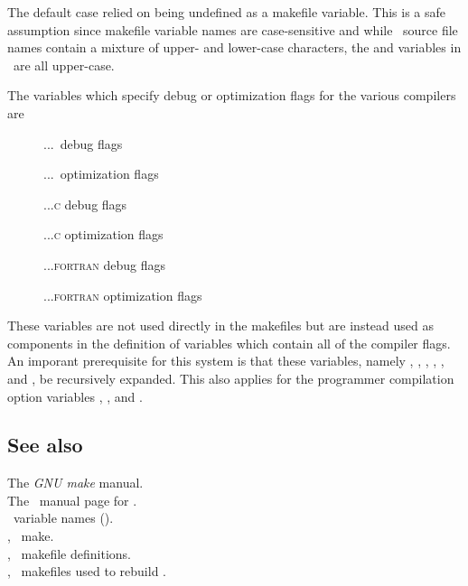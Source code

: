 \noindent
The default case relied on  being undefined as a makefile
variable.  This is a safe assumption since makefile variable names are
case-sensitive and while \aipspp\ source file names contain a mixture of
upper- and lower-case characters, the  and 
variables in \aipspp\ are all upper-case.

The  variables which specify debug or optimization flags for
the various compilers are

\begin{description}
   \item[]  ...\cplusplus\ debug flags
   \item[]  ...\cplusplus\ optimization flags
   \item[]    ...\textsc{c} debug flags
   \item[]    ...\textsc{c} optimization flags
   \item[]   ...\textsc{fortran} debug flags
   \item[]   ...\textsc{fortran} optimization flags
\end{description}

\noindent
These variables are not used directly in the makefiles but are instead used as
components in the definition of variables which contain all of the compiler
flags.  An imporant prerequisite for this system is that these variables,
namely , , , , ,
and , be recursively expanded.  This also applies for the
programmer compilation option variables , , and
.

\subsection*{See also}
 
The \textit{GNU make} manual.\\
The \gnu\ manual page for .\\
\aipspp\ variable names ().\\
, \gnu\ make.\\
, \aipspp\ makefile definitions.\\
, \gnu\ makefiles used to rebuild \aipspp.


